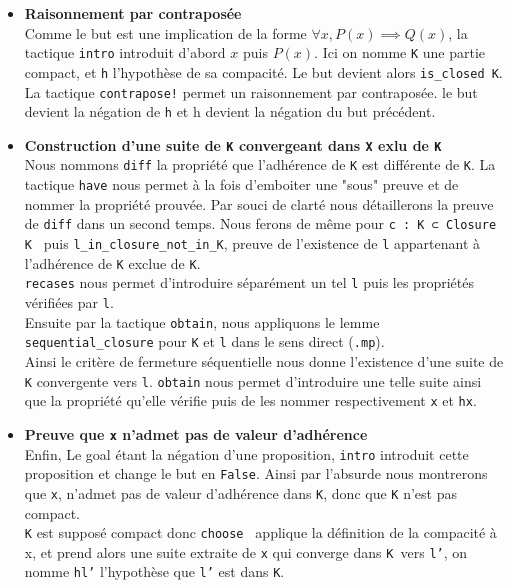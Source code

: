 \documentclass[a4paper, 12pt]{article}
\newcommand{\lean}[1]{\texttt{#1}}
\begin{document}
\begin{itemize}[itemsep=30pt]
    \item \textbf{Raisonnement par contraposée}\\
        Comme le but est une implication de la forme $ \forall x, P(x) \implies Q(x)$, la tactique \lean{intro} introduit d'abord $x$ puis $P(x)$. Ici on nomme \lean{K} une partie compact, et \lean{h} l'hypothèse de sa compacité. Le but devient alors \lean{is_closed K}.\\
        La tactique \lean{contrapose!} permet un raisonnement par contraposée. le but devient la négation de \lean{h} et h devient la négation du but précédent.
    \item \textbf{Construction d'une suite de \lean{K} convergeant dans \lean{X} exlu de \lean{K} }\\
        Nous nommons \lean{diff} la propriété que l'adhérence de \lean{K} est différente de \lean{K}. La tactique \lean{have} nous permet à la fois d'emboiter une "sous" preuve et de nommer la propriété prouvée. Par souci de clarté nous détaillerons la preuve de \lean{diff} dans un second temps. Nous ferons de même pour \lean{c : K ⊂ Closure K } puis \lean{l_in_closure_not_in_K}, preuve de l'existence de \lean{l} appartenant à l'adhérence de \lean{K} exclue de \lean{K}.\\
        \lean{recases} nous permet d'introduire séparément un tel \lean{l} puis les propriétés vérifiées par \lean{l}.\\
        Ensuite par la tactique \lean{obtain}, nous appliquons le lemme \lean{sequential_closure} pour \lean{K} et \lean{l} dans le sens direct (\lean{.mp}).\\
        Ainsi le critère de fermeture séquentielle nous donne l'existence d'une suite de \lean{K} convergente vers \lean{l}. \lean{obtain} nous permet d'introduire une telle suite ainsi que la propriété qu'elle vérifie puis de les nommer respectivement \lean{x} et \lean{hx}.
    \item \textbf{ Preuve que \lean{x} n'admet pas de valeur d'adhérence}\\
        Enfin, Le goal étant la négation d'une proposition, \lean{intro} introduit cette proposition et change le but en \lean{False}. Ainsi par l'absurde nous montrerons que \lean{x}, n'admet pas de valeur d'adhérence dans \lean{K}, donc que \lean{K} n'est pas compact. \\
        \lean{K} est supposé compact donc \lean{choose } applique la définition de la compacité à x, et prend alors une suite extraite de \lean{x} qui converge dans \lean{K }vers \lean{l'}, on nomme \lean{hl'} l'hypothèse que \lean{l'} est dans \lean{K}.\\

\end{itemize}
\end{document}
